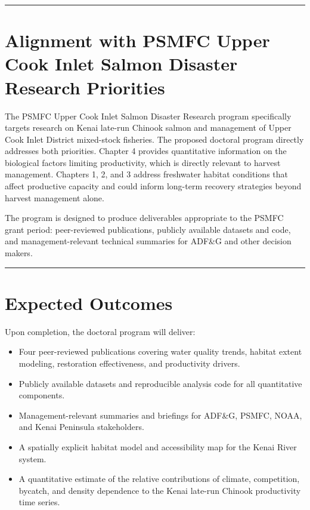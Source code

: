 \documentclass[
  letterpaper,
  DIV=11,
  numbers=noendperiod]{scrreprt}
\providecommand{\tightlist}{%
  \setlength{\itemsep}{0pt}\setlength{\parskip}{0pt}}
\begin{document}
\begin{center}\rule{0.5\linewidth}{0.5pt}\end{center}

\section{Alignment with PSMFC Upper Cook Inlet Salmon Disaster Research
Priorities}\label{alignment-with-psmfc-upper-cook-inlet-salmon-disaster-research-priorities}

The PSMFC Upper Cook Inlet Salmon Disaster Research program specifically
targets research on Kenai late-run Chinook salmon and management of
Upper Cook Inlet District mixed-stock fisheries. The proposed doctoral
program directly addresses both priorities. Chapter 4 provides
quantitative information on the biological factors limiting
productivity, which is directly relevant to harvest management. Chapters
1, 2, and 3 address freshwater habitat conditions that affect productive
capacity and could inform long-term recovery strategies beyond harvest
management alone.

The program is designed to produce deliverables appropriate to the PSMFC
grant period: peer-reviewed publications, publicly available datasets
and code, and management-relevant technical summaries for ADF\&G and
other decision makers.

\begin{center}\rule{0.5\linewidth}{0.5pt}\end{center}

\section{Expected Outcomes}\label{expected-outcomes}

Upon completion, the doctoral program will deliver:

\begin{itemize}
\tightlist
\item
  Four peer-reviewed publications covering water quality trends, habitat
  extent modeling, restoration effectiveness, and productivity drivers.
\item
  Publicly available datasets and reproducible analysis code for all
  quantitative components.
\item
  Management-relevant summaries and briefings for ADF\&G, PSMFC, NOAA,
  and Kenai Peninsula stakeholders.
\item
  A spatially explicit habitat model and accessibility map for the Kenai
  River system.
\item
  A quantitative estimate of the relative contributions of climate,
  competition, bycatch, and density dependence to the Kenai late-run
  Chinook productivity time series.
\end{itemize}
\end{document}
